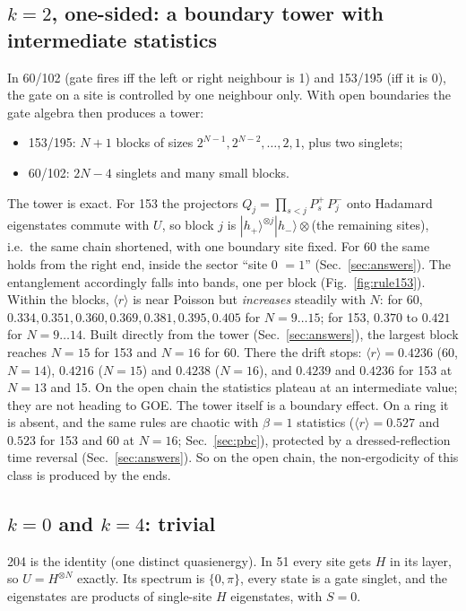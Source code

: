 \subsection{$k=2$, one-sided: a boundary tower with intermediate statistics}
In 60/102 (gate fires iff the left or right neighbour is 1) and 153/195 (iff it is 0), the gate on a site is controlled by
one neighbour only. With open boundaries the gate algebra then produces a tower:
\begin{itemize}
\item 153/195: $N+1$ blocks of sizes $2^{N-1},2^{N-2},\ldots,2,1$, plus two singlets;
\item 60/102: $2N-4$ singlets and many small blocks.
\end{itemize}
The tower is exact. For 153 the projectors $Q_j=\prod_{s<j}P^+_s\,P^-_j$ onto Hadamard eigenstates commute with $U$,
so block $j$ is $|h_+\rangle^{\otimes j}|h_-\rangle\otimes$(the remaining sites), i.e.\ the same chain shortened, with
one boundary site fixed. For 60 the same holds from the right end, inside the sector ``site 0 $=1$''
(Sec.~\ref{sec:answers}). The entanglement accordingly falls into bands, one per block (Fig.~\ref{fig:rule153}). Within the blocks,
$\langle r\rangle$ is near Poisson but \emph{increases} steadily with $N$: for 60, $0.334, 0.351, 0.360, 0.369, 0.381, 0.395, 0.405$ for $N=9\ldots15$; for 153, $0.370$ to $0.421$ for
$N=9\ldots14$. Built directly from the tower (Sec.~\ref{sec:answers}), the largest block reaches $N=15$ for 153 and $N=16$ for 60.
There the drift stops: $\langle r\rangle=0.4236$ (60, $N=14$), $0.4216$ ($N=15$) and $0.4238$ ($N=16$), and $0.4239$
and $0.4236$ for 153 at $N=13$ and 15. On the open chain the statistics plateau at an intermediate value; they are not
heading to GOE. The tower itself is a boundary effect. On a ring it is absent, and
the same rules are chaotic with $\beta=1$ statistics ($\langle r\rangle=0.527$ and $0.523$ for 153 and 60 at $N=16$;
Sec.~\ref{sec:pbc}), protected by a dressed-reflection time reversal (Sec.~\ref{sec:answers}). So
on the open chain, the non-ergodicity of this class is produced by the ends.

\subsection{$k=0$ and $k=4$: trivial}
204 is the identity (one distinct quasienergy). In 51 every site gets $H$ in its layer, so $U=H^{\otimes N}$ exactly. Its
spectrum is $\{0,\pi\}$, every state is a gate singlet, and the eigenstates are products of single-site $H$ eigenstates,
with $S=0$.

